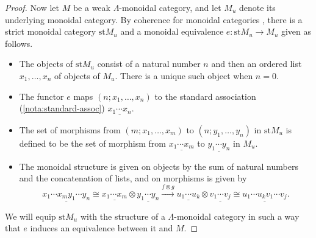 \begin{proof}
Now let $M$ be a weak $\Lambda$-monoidal category, and let $M_u$ denote its underlying monoidal category. By coherence for monoidal categories \cite{js,coh3d}, there is a strict monoidal category $\textrm{st} M_u$ and a monoidal equivalence $e \colon \textrm{st} M_u \to M_u$ given as follows.
\begin{itemize}
\item The objects of $\textrm{st} M_u$ consist of a natural number $n$ and then an ordered list $x_1, \ldots, x_n$ of objects of $M_u$. There is a unique such object when $n=0$.
\item The functor $e$ maps $(n; x_1, \ldots, x_n)$ to the standard association (\cref{nota:standard-assoc}) $\underline{x_1 \cdots x_n}$.
\item The set of morphisms from $(m; x_1, \ldots, x_m)$ to $(n; y_1, \ldots, y_n)$ in $\textrm{st} M_u$ is defined to be the set of morphism from $\underline{x_1 \cdots x_m}$ to $\underline{y_1 \cdots y_n}$ in $M_u$.
\item The monoidal structure is given on objects by the sum of natural numbers and the concatenation of lists, and on morphisms is given by
\[
\underline{x_1 \cdots x_m y_1 \cdots y_n} \cong \underline{x_1 \cdots x_m} \otimes \underline{y_1 \cdots y_n} \stackrel{f \otimes g}{\to} \underline{u_1 \cdots u_k} \otimes \underline{v_1 \cdots v_j} \cong \underline{u_1 \cdots u_kv_1 \cdots v_j}.
\]
\end{itemize}
We will equip $\textrm{st} M_u$ with the structure of a $\Lambda$-monoidal category in such a way that $e$ induces an equivalence between it and $M$.


\end{proof}
